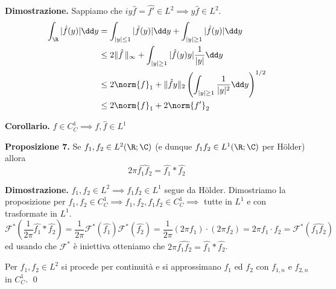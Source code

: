 \textbf{Dimostrazione.}
Sappiamo che $iy \hat f = \hat{f'} \in L^2 \implies y \hat f \in L^2$.
$$
\begin{aligned}
	\int_{\R} |\hat f(y)| \dd y 
	& = \int_{|y| \leq 1} |\hat f(y)| \dd y + \int_{|y| \geq 1} |\hat f(y)| \dd y \\
	& \leq 2 \| \hat f\, \|_\infty + \int_{|y| \geq 1} |\hat f(y) y| \frac{1}{|y|} \dd y \\
	& \leq 2 \norm{f}_1 + \| \hat f y \|_2 \left( \int_{|y| \geq 1} \frac{1}{|y|^2} \dd y \right)^{1/2} \\
	& \leq 2 \norm{f}_1 + 2 \norm{f'}_2
\end{aligned}
$$

\textbf{Corollario.}
$f \in C_C^1 \implies f, \hat f \in L^1$

\textbf{Proposizione 7.}
Se $f_1, f_2 \in L^2(\R; \C)$ (e dunque $f_1 f_2 \in L^1(\R; \C)$ per H\"older) allora
$$
2\pi \hat{f_1 f_2} = \hat{f_1} \ast \hat{f_2}
$$

\textbf{Dimostrazione.}
$f_1, f_2 \in L^2 \implies f_1 f_2 \in L^1$ segue da H\"older. Dimostriamo la proposizione per $f_1, f_2 \in C_C^1 \implies f_1, f_2, f_1 f_2 \in C_C^1 \implies$ tutte in $L^1$ e con trasformate in $L^1$.
$$
\mathcal F^* \left( \frac{1}{2\pi} \hat{f_1} \ast \hat{f_2} \right)
= \frac{1}{2\pi} \mathcal F^*(\hat{f_1}) \mathcal F^*(\hat{f_2})
= \frac{1}{2\pi} (2\pi f_1) \cdot (2\pi f_2)
= 2\pi f_1 \cdot f_2 = \mathcal F^*(\hat{f_1 f_2})
$$
ed usando che $\mathcal F^*$ è iniettiva otteniamo che $2 \pi \hat{f_1 f_2} = \hat{f_1} \ast \hat{f_2} $. 

Per $f_1, f_2 \in L^2$ si procede per continuità e si approssimano $f_1$ ed $f_2$ con $f_{1,n}$ e $f_{2,n}$ in $C_C^1$.
\qed
